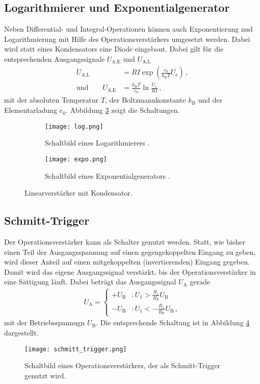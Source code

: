 \documentclass[
  bibliography=totoc,     %
  captions=tableheading,  %
  titlepage=firstiscover, %
]{scrartcl}
\begin{document}
\subsection{Logarithmierer und Exponentialgenerator}
\label{subsec:log_expo}
Neben Differential- und Integral-Operationen können auch Exponentierung nud
Logarithmierung mit Hilfe des Operationsverstärkers umgesetzt werden.
Dabei wird statt eines Kondensators eine Diode eingebaut.
Dabei gilt für die entsprechenden Ausgangssignale $U_\text{A,E}$ und
$U_\text{A,L}$
\begin{align*}
    U_\text{A,L} &= R I \exp\left(\frac{e_0}{k_\text{B}T} U_\text{e}\right)\,,\\
    \text{und} \qquad U_\text{A,E} &= \frac{k_\text{B}T}{e_0}\ln \frac{U_\text{e}}{R I}\,,
\end{align*}
mit der absoluten Temperatur $T$, der Boltzmannkonstante $k_\text{B}$ und
der Elementarladung $e_0$. Abbildung \ref{fig:log_expo} zeigt die Schaltungen.
\begin{figure}
    \begin{subfigure}{.49\linewidth}
        \centering
        \texttt{[image: log.png]}
        \caption{Schaltbild eines Logarithmierers \cite{V51}.}
        \label{fig:log}
    \end{subfigure}
    \begin{subfigure}{.49\linewidth}
        \centering
        \texttt{[image: expo.png]}
        \caption{Schaltbild eines Exponentialgenerators \cite{V51}.}
        \label{fig:expo}
    \end{subfigure}
    \caption{Linearverstärker mit Kondensator.}
    \label{fig:log_expo}
\end{figure}

\subsection{Schmitt-Trigger}
\label{subsec:schmitt_trigger}
Der Operationsverstärker kann als Schalter genutzt werden. Statt, wie bisher
einen Teil der Ausgangsspannung auf einen gegengekoppelten Eingang zu geben,
wird dieser Anteil auf einen mitgekoppelten (invertierenden) Eingang gegeben.
Damit wird das eigene Ausgangssignal verstärkt, bis der Operationsverstärker
in eine Sättigung läuft.
Dabei beträgt das Ausgangssignal $U_\text{A}$ gerade
\begin{align*}
    U_\text{A} =
    \begin{cases}
        +U_\text{B} &: U_1 > \frac{R_1}{R_\text{P}}U_\text{B} \\
        -U_\text{B} &: U_1 < -\frac{R_1}{R_\text{P}}U_\text{B}\,,
    \end{cases}
\end{align*}
mit der Betriebsspannugn $U_\text{B}$.
Die entsprechende Schaltung ist in Abbildung \ref{fig:schmitt_trigger}
dargestellt.
\begin{figure}
    \centering
    \texttt{[image: schmitt\_trigger.png]}
    \caption{
        Schaltbild eines Operationsverstärkers, der als Schmitt-Trigger
        genutzt wird.
    }
    \label{fig:schmitt_trigger}
\end{figure}
\end{document}
